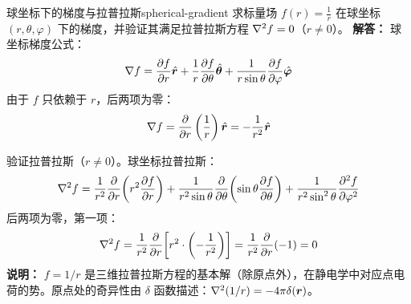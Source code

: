 \begin{example}{球坐标下的梯度与拉普拉斯}{spherical-gradient}
求标量场 $f(r)=\frac{1}{r}$ 在球坐标 $(r,\theta,\varphi)$ 下的梯度，并验证其满足拉普拉斯方程 $\nabla^2 f=0$（$r\neq 0$）。
\tcblower
\textbf{解答：}
球坐标梯度公式：
\[
\nabla f = \frac{\partial f}{\partial r}\hat{\bm{r}} + \frac{1}{r}\frac{\partial f}{\partial\theta}\hat{\bm{\theta}} + \frac{1}{r\sin\theta}\frac{\partial f}{\partial\varphi}\hat{\bm{\varphi}}
\]
由于 $f$ 只依赖于 $r$，后两项为零：
\[
\nabla f = \frac{\partial}{\partial r}\left(\frac{1}{r}\right)\hat{\bm{r}} = -\frac{1}{r^2}\hat{\bm{r}}
\]

验证拉普拉斯（$r\neq 0$）。球坐标拉普拉斯：
\[
\nabla^2 f = \frac{1}{r^2}\frac{\partial}{\partial r}\!\left(r^2\frac{\partial f}{\partial r}\right) + \frac{1}{r^2\sin\theta}\frac{\partial}{\partial\theta}\!\left(\sin\theta\frac{\partial f}{\partial\theta}\right) + \frac{1}{r^2\sin^2\theta}\frac{\partial^2 f}{\partial\varphi^2}
\]
后两项为零，第一项：
\[
\nabla^2 f = \frac{1}{r^2}\frac{\partial}{\partial r}\!\left[r^2\cdot\left(-\frac{1}{r^2}\right)\right] = \frac{1}{r^2}\frac{\partial}{\partial r}(-1) = 0
\]
\textbf{说明：} $f=1/r$ 是三维拉普拉斯方程的基本解（除原点外），在静电学中对应点电荷的势。原点处的奇异性由 $\delta$ 函数描述：$\nabla^2(1/r)=-4\pi\delta(\bm{r})$。
\end{example}

